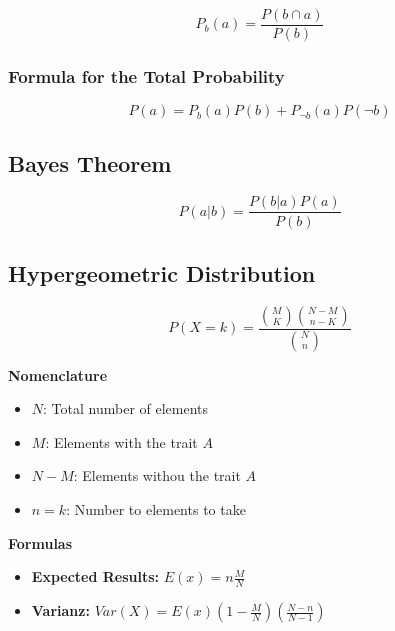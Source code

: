\[P_b (a) = \frac{P(b \cap a)}{P(b)}\]

\subsubsection{Formula for the Total Probability}

\[P(a) = P_b (a) P(b) + P_{\neg b}(a) P(\neg b)\]

\subsection{Bayes Theorem}

\[P(a | b) = \frac{P(b | a) P(a)}{P(b)}\]

\subsection{Hypergeometric Distribution}

\[P(X = k) = \frac{\binom{M}{K} \binom{N - M}{n - K}}{\binom{N}{n}}\]

\textbf{Nomenclature}
\begin{itemize}[label=\(-\)]
    \item \(N\): Total number of elements
    \item \(M\): Elements with the trait \(A\)
    \item \(N - M\): Elements withou the trait \(A\)
    \item \(n = k\): Number to elements to take
\end{itemize}

\textbf{Formulas }
\begin{itemize}[label=\(-\)]
    \item \textbf{Expected Results: } \(E(x) = n \frac{M}{N}\)
    \item \textbf{Varianz: } \(Var(X) = E(x)\left(1 - \frac{M}{N}\right) \left(\frac{N - n}{N - 1}\right)\)
\end{itemize}

\newpage
